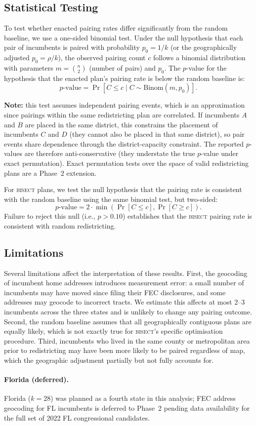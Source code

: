 \subsection{Statistical Testing}

To test whether enacted pairing rates differ significantly from the random baseline,
we use a one-sided binomial test. Under the null hypothesis that each pair of
incumbents is paired with probability $p_0 = 1/k$ (or the geographically adjusted
$p_0 = \rho / k$), the observed pairing count $c$ follows a binomial distribution
with parameters $m = \binom{n}{2}$ (number of pairs) and $p_0$. The $p$-value for
the hypothesis that the enacted plan's pairing rate is below the random baseline is:
\[
  p\text{-value} = \Pr[C \leq c \mid C \sim \text{Binom}(m, p_0)].
\]

\textbf{Note:} this test assumes independent pairing events, which is an approximation
since pairings within the same redistricting plan are correlated. If incumbents $A$ and
$B$ are placed in the same district, this constrains the placement of incumbents $C$ and
$D$ (they cannot also be placed in that same district), so pair events share dependence
through the district-capacity constraint. The reported $p$-values are therefore
anti-conservative (they understate the true $p$-value under exact permutation). Exact
permutation tests over the space of valid redistricting plans are a Phase~2 extension.

For \textsc{bisect} plans, we test the null hypothesis that the pairing rate is
consistent with the random baseline using the same binomial test, but two-sided:
\[
  p\text{-value} = 2 \cdot \min\left(\Pr[C \leq c], \Pr[C \geq c]\right).
\]
Failure to reject this null (i.e., $p > 0.10$) establishes that the \textsc{bisect}
pairing rate is consistent with random redistricting.

\subsection{Limitations}

Several limitations affect the interpretation of these results. First, the geocoding
of incumbent home addresses introduces measurement error: a small number of incumbents
may have moved since filing their FEC disclosures, and some addresses may geocode
to incorrect tracts. We estimate this affects at most 2--3 incumbents across the three
states and is unlikely to change any pairing outcome. Second, the random baseline
assumes that all geographically contiguous plans are equally likely, which is not
exactly true for \textsc{bisect}'s specific optimisation procedure. Third, incumbents
who lived in the same county or metropolitan area prior to redistricting may have been
more likely to be paired regardless of map, which the geographic adjustment partially
but not fully accounts for.

\paragraph{Florida (deferred).}
Florida ($k=28$) was planned as a fourth state in this analysis; FEC address geocoding
for FL incumbents is deferred to Phase~2 pending data availability for the full set
of 2022 FL congressional candidates.
